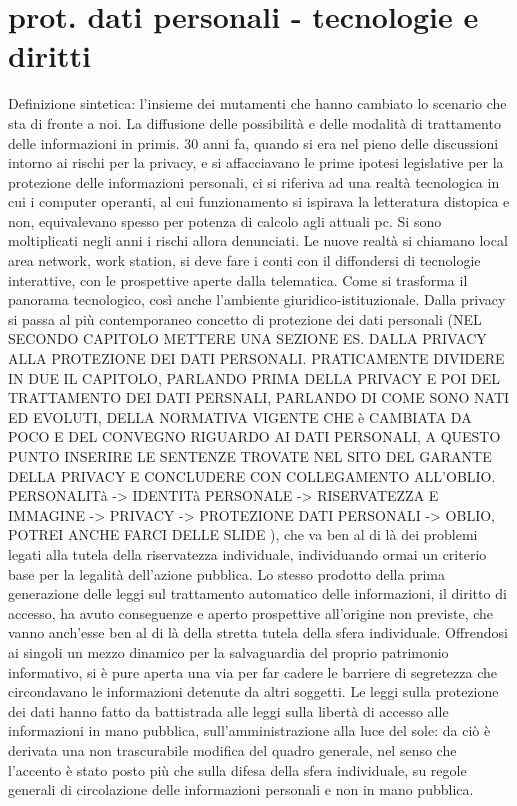 \section{prot. dati personali  - tecnologie e diritti}
Definizione sintetica: l’insieme dei mutamenti che hanno cambiato lo scenario che sta di fronte a noi. La diffusione delle possibilità e delle modalità di trattamento delle informazioni in primis.
 30 anni fa, quando si era nel pieno delle discussioni intorno ai rischi per la privacy, e si affacciavano le prime ipotesi legislative per la protezione delle informazioni personali, ci si riferiva ad una realtà tecnologica in cui i computer operanti, al cui funzionamento si ispirava la letteratura distopica e non, equivalevano spesso per potenza di calcolo agli attuali pc. Si sono moltiplicati negli anni i rischi allora denunciati. 
Le nuove realtà si chiamano local area network, work station, si deve fare i conti con il diffondersi di tecnologie interattive, con le prospettive aperte dalla telematica. Come si trasforma il panorama tecnologico, così anche l’ambiente giuridico-istituzionale. Dalla privacy si passa al più contemporaneo concetto di protezione dei dati personali (NEL SECONDO CAPITOLO METTERE UNA SEZIONE ES. DALLA PRIVACY ALLA PROTEZIONE DEI DATI PERSONALI. PRATICAMENTE DIVIDERE IN DUE IL CAPITOLO, PARLANDO PRIMA DELLA PRIVACY E POI DEL TRATTAMENTO DEI DATI PERSNALI, PARLANDO DI COME SONO NATI ED EVOLUTI, DELLA NORMATIVA VIGENTE CHE è CAMBIATA DA POCO E DEL CONVEGNO RIGUARDO AI DATI PERSONALI, A QUESTO PUNTO INSERIRE LE SENTENZE TROVATE NEL SITO DEL GARANTE DELLA PRIVACY E CONCLUDERE CON COLLEGAMENTO ALL’OBLIO.          PERSONALITà -> IDENTITà PERSONALE -> RISERVATEZZA E IMMAGINE -> PRIVACY -> PROTEZIONE DATI PERSONALI -> OBLIO, POTREI ANCHE FARCI DELLE SLIDE ), che va ben al di là dei problemi legati alla tutela della riservatezza individuale, individuando ormai un criterio base per la legalità dell’azione pubblica.
Lo stesso prodotto della prima generazione delle leggi sul trattamento automatico delle informazioni, il diritto di accesso, ha avuto conseguenze e aperto prospettive all’origine non previste, che vanno anch’esse ben al di là della stretta tutela della sfera individuale. Offrendosi ai singoli un mezzo dinamico per la salvaguardia del proprio patrimonio informativo, si è pure aperta una via per far cadere le barriere di segretezza che circondavano le informazioni detenute da altri soggetti. Le leggi sulla protezione dei dati hanno fatto da battistrada alle leggi sulla libertà di accesso alle informazioni in mano pubblica, sull’amministrazione alla luce del sole: da ciò è derivata una non trascurabile modifica del quadro generale, nel senso che l’accento è stato posto più che sulla difesa della sfera individuale, su regole generali di circolazione delle informazioni personali e non in mano pubblica.
